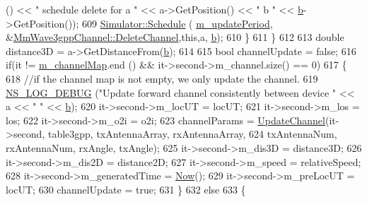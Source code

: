 \begin{DoxyCode}
      () << \textcolor{stringliteral}{" schedule delete for a "} << a->GetPosition() << \textcolor{stringliteral}{" b "} << \hyperlink{buildings__pathloss_8m_a21ad0bd836b90d08f4cf640b4c298e7c}{b}->GetPosition());
609                                 \hyperlink{classns3_1_1Simulator_a671882c894a08af4a5e91181bf1eec13}{Simulator::Schedule} (
      \hyperlink{classns3_1_1MmWave3gppChannel_a2844f8c7e7373cb777384eaf0e8a7b11}{m\_updatePeriod}, &\hyperlink{classns3_1_1MmWave3gppChannel_a3ec4e2d8d84d7876581a00fa5174a1a5}{MmWave3gppChannel::DeleteChannel},\textcolor{keyword}{this},a,
      \hyperlink{buildings__pathloss_8m_a21ad0bd836b90d08f4cf640b4c298e7c}{b});
610                         \}
611                 \}
612 
613                 \textcolor{keywordtype}{double} distance3D = a->GetDistanceFrom(\hyperlink{buildings__pathloss_8m_a21ad0bd836b90d08f4cf640b4c298e7c}{b});
614 
615                 \textcolor{keywordtype}{bool} channelUpdate = \textcolor{keyword}{false};
616                 \textcolor{keywordflow}{if}(it != \hyperlink{classns3_1_1MmWave3gppChannel_a31f05f0c8a438b8ce89f29813e863040}{m\_channelMap}.end () && it->second->m\_channel.size() == 0)
617                 \{
618                         \textcolor{comment}{//if the channel map is not empty, we only update the channel.}
619                         \hyperlink{group__logging_ga413f1886406d49f59a6a0a89b77b4d0a}{NS\_LOG\_DEBUG} (\textcolor{stringliteral}{"Update forward channel consistently between device "} << 
      a << \textcolor{stringliteral}{" "} << \hyperlink{buildings__pathloss_8m_a21ad0bd836b90d08f4cf640b4c298e7c}{b});
620                         it->second->m\_locUT = locUT;
621                         it->second->m\_los = los;
622                         it->second->m\_o2i = o2i;
623                         channelParams = \hyperlink{classns3_1_1MmWave3gppChannel_a765f45f9d98c15655c8ea6288e86f111}{UpdateChannel}(it->second, table3gpp, txAntennaArray, 
      rxAntennaArray,
624                                         txAntennaNum, rxAntennaNum, rxAngle, txAngle);
625                         it->second->m\_dis3D = distance3D;
626                         it->second->m\_dis2D = distance2D;
627                         it->second->m\_speed = relativeSpeed;
628                         it->second->m\_generatedTime = \hyperlink{group__simulator_gac3635e2e87f7ce316c89290ee1b01d0d}{Now}();
629                         it->second->m\_preLocUT = locUT;
630                         channelUpdate = \textcolor{keyword}{true};
631                 \}
632                 \textcolor{keywordflow}{else}
633                 \{

\end{DoxyCode}

